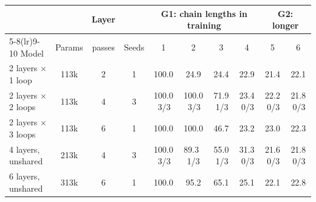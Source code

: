 \begin{tabular}{@{}lccccccccc@{}}
\toprule
& & Layer & & \multicolumn{4}{c}{G1: chain lengths in training} & \multicolumn{2}{c}{G2: longer} \\
\cmidrule(lr){5-8}\cmidrule(lr){9-10}
Model & Params & passes & Seeds & 1 & 2 & 3 & 4 & 5 & 6 \\
\midrule
2 layers $\times$ 1 loop & 113k & 2 & 1 & 100.0 & 24.9 & 24.4 & 22.9 & 21.4 & 22.1 \\
2 layers $\times$ 2 loops & 113k & 4 & 3 & 100.0 {\scriptsize\,3/3} & 100.0 {\scriptsize\,3/3} & 71.9 {\scriptsize\,1/3} & 23.4 {\scriptsize\,0/3} & 22.2 {\scriptsize\,0/3} & 21.8 {\scriptsize\,0/3} \\
2 layers $\times$ 3 loops & 113k & 6 & 1 & 100.0 & 100.0 & 46.7 & 23.2 & 23.0 & 22.3 \\
4 layers, unshared & 213k & 4 & 3 & 100.0 {\scriptsize\,3/3} & 89.3 {\scriptsize\,1/3} & 55.0 {\scriptsize\,1/3} & 31.3 {\scriptsize\,0/3} & 21.6 {\scriptsize\,0/3} & 21.8 {\scriptsize\,0/3} \\
6 layers, unshared & 313k & 6 & 1 & 100.0 & 95.2 & 65.1 & 25.1 & 22.1 & 22.8 \\
\bottomrule
\end{tabular}
